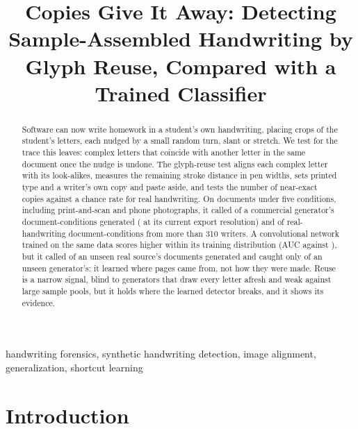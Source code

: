 \documentclass[conference]{IEEEtran}
\begin{document}
\title{Copies Give It Away: Detecting Sample-Assembled Handwriting by Glyph Reuse, Compared with a Trained Classifier}

\author{}

\maketitle

\begin{abstract}
Software can now write homework in a student's own handwriting, placing crops of the student's letters, each nudged
by a small random turn, slant or stretch. We test for the trace this leaves: complex letters that coincide with another
letter in the same document once the nudge is undone. The glyph-reuse test aligns each complex letter with its
look-alikes, measures the remaining stroke distance in pen widths, sets printed type and a writer's own copy and paste
aside, and tests the number of near-exact copies against a chance rate for real handwriting. On \NumDocs{} documents
under five conditions, including print-and-scan and phone photographs, it called \TwinScribeAll{} of a commercial
generator's document-conditions generated (\TwinScribeNew{} at its current export resolution) and \TwinRealAllK{} of
\TwinRealAllN{} real-handwriting document-conditions from more than 310 writers. A convolutional network trained on the
same data scores higher within its training distribution (AUC \CnnRandomAuc{} against \TwinRandomAuc{}), but it called
\CnnHoldoutRealCvlFa{} of an unseen real source's documents generated and caught only \CnnHoldoutGenScribeDet{} of an
unseen generator's: it learned where pages came from, not how they were made. Reuse is a narrow signal, blind to
generators that draw every letter afresh and weak against large sample pools, but it holds where the learned detector
breaks, and it shows its evidence.
\end{abstract}

\begin{IEEEkeywords}
handwriting forensics, synthetic handwriting detection, image alignment, generalization, shortcut learning
\end{IEEEkeywords}

\section{Introduction}
\end{document}
